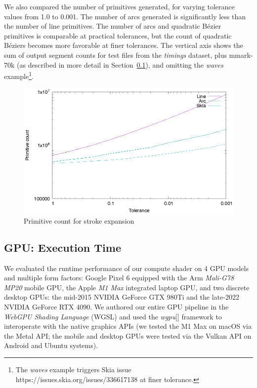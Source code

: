 \documentclass[sigconf, authordraft]{acmart}
\begin{document}
We also compared the number of primitives generated, for varying tolerance values from 1.0 to 0.001. The number of arcs generated is significantly less than the number of line primitives. The number of arcs and quadratic Bézier primitives is comparable at practical tolerances, but the count of quadratic Béziers becomes more favorable at finer tolerances. The vertical axis shows the sum of output segment counts for test files from the \emph{timings} dataset, plus mmark-70k (as described in more detail in Section~\ref{subsection:gpu-results}), and omitting the \emph{waves} example\footnote{The \emph{waves} example triggers Skia issue https://issues.skia.org/issues/336617138 at finer tolerance.}.

\begin{figure}
    \includegraphics[scale=0.6]{prim_count}
    \caption{Primitive count for stroke expansion}
    \label{fig:prim_count}
\end{figure}

\subsection{GPU: Execution Time} \label{subsection:gpu-results}

We evaluated the runtime performance of our compute shader on 4 GPU models and multiple form factors: Google Pixel 6 equipped with the Arm \emph{Mali-G78 MP20} mobile GPU, the Apple \emph{M1 Max} integrated laptop GPU, and two discrete desktop GPUs: the mid-2015 NVIDIA {GeForce GTX 980Ti} and the late-2022 NVIDIA {GeForce RTX 4090}. We authored our entire GPU pipeline in the \emph{WebGPU Shading Language} (WGSL) and used the \emph{wgpu}[] framework to interoperate with the native graphics APIs (we tested the M1 Max on macOS via the Metal API; the mobile and desktop GPUs were tested via the Vulkan API on Android and Ubuntu systems).
\end{document}
